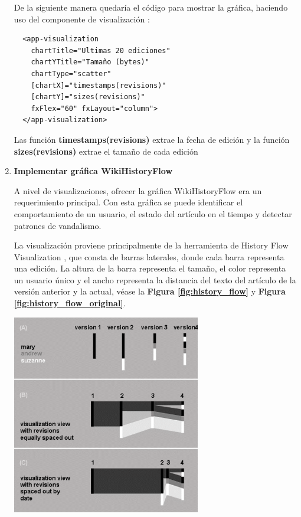\begin{enumerate}
  De la siguiente manera quedaría el código para mostrar la gráfica, haciendo uso del componente de visualización :
  \begin{verbatim}
  <app-visualization
    chartTitle="Ultimas 20 ediciones"
    chartYTitle="Tamaño (bytes)"
    chartType="scatter"
    [chartX]="timestamps(revisions)"
    [chartY]="sizes(revisions)" 
    fxFlex="60" fxLayout="column">
  </app-visualization>
  \end{verbatim}
  
  Las función \textbf{timestamps(revisions)} extrae la fecha de edición y la función \textbf{sizes(revisions)} extrae el tamaño de cada edición
  
  \smallbreak
  \item\textbf{Implementar gráfica WikiHistoryFlow}
  \smallbreak

  A nivel de visualizaciones, ofrecer la gráfica WikiHistoryFlow era un requerimiento principal. Con esta gráfica se puede identificar el comportamiento de un usuario, el estado del artículo en el tiempo y detectar patrones de vandalismo.
  
  La visualización proviene principalmente de la herramienta de History Flow Visualization \cite{HistoryFlow}, que consta de barras laterales, donde cada barra representa una edición. La altura de la barra representa el tamaño, el color representa un usuario único y el ancho representa la distancia del texto del artículo de la versión anterior y la actual, véase la \textbf{Figura \ref{fig:history_flow}} y \textbf{Figura \ref{fig:history_flow_original}}.
  
  \begin{center}
      \bigbreak
      \includegraphics{images/marco_aplicativo/history_flow1.png}
      \label{fig:history_flow}
      \bigbreak
  \end{center}
  

\end{enumerate}
